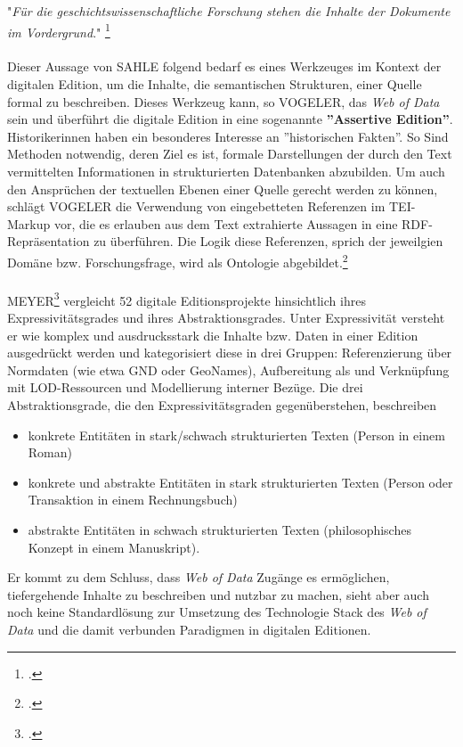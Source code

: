 \documentclass[12pt,a4paper]{article}
\begin{document}
"\textit{Für die geschichtswissenschaftliche Forschung stehen die Inhalte der Dokumente im Vordergrund}."
\footcite[][S.236]{sahle2017dhedition}
\\
\\
Dieser Aussage von SAHLE folgend bedarf es eines Werkzeuges im Kontext der digitalen Edition, um die Inhalte, die semantischen Strukturen, einer Quelle formal zu beschreiben. Dieses Werkzeug kann, so VOGELER, das \textit{Web of Data} sein und überführt die digitale Edition in eine sogenannte \textbf{''Assertive Edition''}.
\\  
Historikerinnen haben ein besonderes Interesse an ''historischen Fakten''. So Sind Methoden notwendig, deren Ziel es ist, formale Darstellungen der durch den Text vermittelten Informationen in strukturierten Datenbanken abzubilden. Um auch den Ansprüchen der textuellen Ebenen einer Quelle gerecht werden zu können, schlägt VOGELER die Verwendung von eingebetteten Referenzen im TEI-Markup vor, die es erlauben aus dem Text extrahierte Aussagen in eine RDF-Repräsentation zu überführen. Die Logik diese Referenzen, sprich der jeweilgien Domäne bzw. Forschungsfrage, wird als Ontologie abgebildet.\footcite[][]{vogeler2019assertive}
\\
\\
MEYER\footcite[][]{meyer2019datenmodellierung}   vergleicht 52 digitale Editionsprojekte hinsichtlich ihres Expressivitätsgrades und ihres Abstraktionsgrades. Unter Expressivität versteht er wie komplex und ausdrucksstark die Inhalte bzw. Daten in einer Edition ausgedrückt werden und kategorisiert diese in drei Gruppen:  Referenzierung über Normdaten (wie etwa GND oder GeoNames), Aufbereitung als und Verknüpfung mit LOD-Ressourcen und Modellierung interner Bezüge. Die drei Abstraktionsgrade, die den Expressivitätsgraden gegenüberstehen, beschreiben 
\begin{itemize}
\item konkrete Entitäten in stark/schwach strukturierten Texten (Person in einem Roman)
\item konkrete und abstrakte Entitäten in stark strukturierten Texten (Person oder Transaktion in einem Rechnungsbuch) 
\item 
abstrakte Entitäten in schwach strukturierten Texten (philosophisches Konzept in einem Manuskript).
\end{itemize}
Er kommt zu dem Schluss, dass \textit{Web of Data} Zugänge es ermöglichen, tiefergehende Inhalte zu beschreiben und nutzbar zu machen, sieht aber auch noch keine Standardlösung zur Umsetzung des Technologie Stack des \textit{Web of Data} und die damit verbunden Paradigmen in digitalen Editionen.
\end{document}
